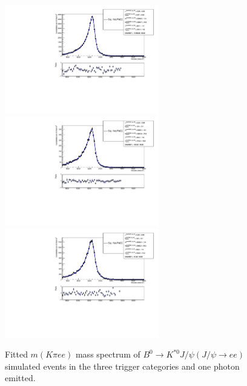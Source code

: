 \begin{figure}[h!]
\centering
\includegraphics[width=0.6\textwidth]{RKst/figs/fit_EEs_0_EE-q2central-gmc/KstJPsEE_1g_L0E_fitAndRes.pdf}
\includegraphics[width=0.6\textwidth]{RKst/figs/fit_EEs_0_EE-q2central-gmc/KstJPsEE_1g_L0H_fitAndRes.pdf}
\includegraphics[width=0.6\textwidth]{RKst/figs/fit_EEs_0_EE-q2central-gmc/KstJPsEE_1g_L0I_fitAndRes.pdf}
\caption{Fitted $m(K\pi ee)$ mass spectrum of $B^0 \rightarrow K^{*0} J/\psi(J/\psi\rightarrow ee)$ simulated
events in the three trigger categories and one photon emitted. }
\label{fig:FitEE_MC_inTrigCat_Brem1}
\end{figure}
%
